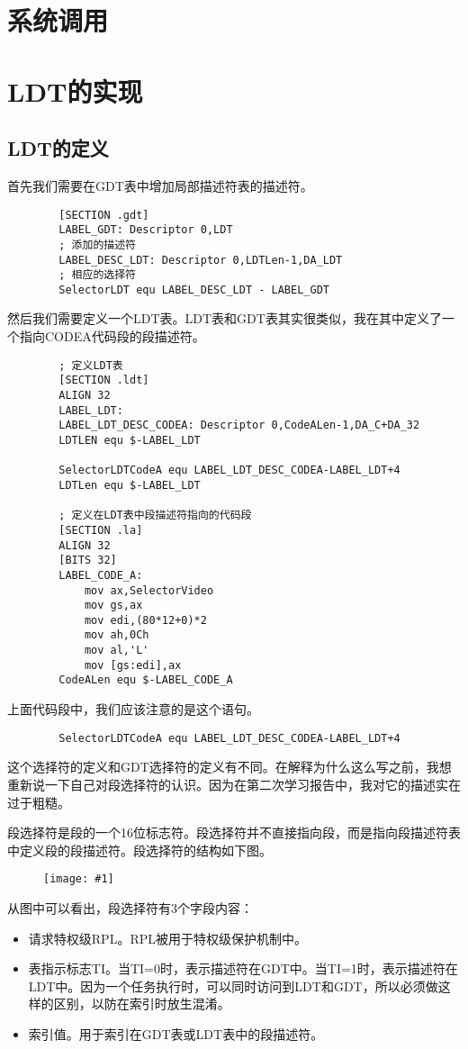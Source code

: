 \documentclass[a4paper,left=2.5cm,right=2.5cm,11pt]{article}
\newcommand{\fic}[1]{\begin{figure}[H]
		\center
		\texttt{[image: \#1]}
	\end{figure}}
\begin{document}
\section{系统调用}
\section{LDT的实现}
\subsection{LDT的定义}
	首先我们需要在GDT表中增加局部描述符表的描述符。
	\begin{lstlisting}
		[SECTION .gdt]
		LABEL_GDT: Descriptor 0,LDT
		; 添加的描述符
		LABEL_DESC_LDT: Descriptor 0,LDTLen-1,DA_LDT
		; 相应的选择符
		SelectorLDT equ LABEL_DESC_LDT - LABEL_GDT
	\end{lstlisting}
	
	然后我们需要定义一个LDT表。LDT表和GDT表其实很类似，我在其中定义了一个指向CODEA代码段的段描述符。
	\begin{lstlisting}
		; 定义LDT表
		[SECTION .ldt]
		ALIGN 32
		LABEL_LDT:
		LABEL_LDT_DESC_CODEA: Descriptor 0,CodeALen-1,DA_C+DA_32
		LDTLEN equ $-LABEL_LDT
		
		SelectorLDTCodeA equ LABEL_LDT_DESC_CODEA-LABEL_LDT+4
		LDTLen equ $-LABEL_LDT
		
		; 定义在LDT表中段描述符指向的代码段
		[SECTION .la]
		ALIGN 32
		[BITS 32]
		LABEL_CODE_A:
			mov ax,SelectorVideo
			mov gs,ax
			mov edi,(80*12+0)*2
			mov ah,0Ch
			mov al,'L'
			mov [gs:edi],ax
		CodeALen equ $-LABEL_CODE_A
	\end{lstlisting}
	
	上面代码段中，我们应该注意的是这个语句。
	\begin{lstlisting}
		SelectorLDTCodeA equ LABEL_LDT_DESC_CODEA-LABEL_LDT+4
	\end{lstlisting}
	
	这个选择符的定义和GDT选择符的定义有不同。在解释为什么这么写之前，我想重新说一下自己对段选择符的认识。因为在第二次学习报告中，我对它的描述实在过于粗糙。\par
	段选择符是段的一个16位标志符。段选择符并不直接指向段，而是指向段描述符表中定义段的段描述符。段选择符的结构如下图。
	\fic{1.png}
	从图中可以看出，段选择符有3个字段内容：
	\begin{itemize}
		\item 请求特权级RPL。RPL被用于特权级保护机制中。
		\item 表指示标志TI。当TI=0时，表示描述符在GDT中。当TI=1时，表示描述符在LDT中。因为一个任务执行时，可以同时访问到LDT和GDT，所以必须做这样的区别，以防在索引时放生混淆。
		\item 索引值。用于索引在GDT表或LDT表中的段描述符。
	\end{itemize}
	
\end{document}
